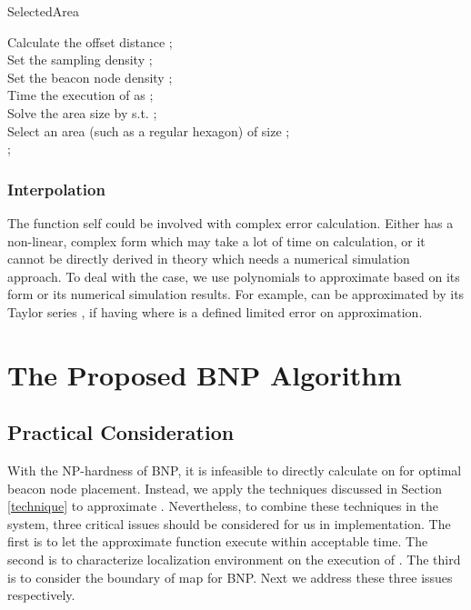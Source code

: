 \documentclass[10pt, conference, letterpaper]{IEEEtran}
\begin{document}
\begin{algorithm} \label{selectedArea}
\caption{SelectedArea}
Calculate the offset distance ;\\
Set the sampling density  ;\\
Set the beacon node density  ;\\
Time the execution of  as ;\\
Solve the area size  by  s.t. ;\\
Select an area  (such as a regular hexagon) of size ;\\
\Return ;
\end{algorithm}

\subsubsection{Interpolation} \label{interpolation}
The function  self could be involved with complex error calculation. Either  has a non-linear, complex form which may take a lot of time on calculation, or it cannot be directly derived in theory which needs a numerical simulation approach. To deal with the case, we use polynomials to approximate  based on its form or its numerical simulation results. For example,  can be approximated by its Taylor series , if  having  where  is a defined limited error on approximation.

\vspace{0.3ex}

\section{The Proposed BNP Algorithm} \label{synthesize}
\subsection{Practical Consideration} \label{sys_consideration}
With the NP-hardness of BNP, it is infeasible to directly calculate on  for optimal beacon node placement. Instead, we apply the techniques discussed in Section \ref{technique} to approximate . Nevertheless, to combine these techniques in the system, three critical issues should be considered for us in implementation. The first is to let the approximate function  execute within acceptable time. The second is to characterize localization environment on the execution of . The third is to consider the boundary of map for BNP. Next we address these three issues respectively.
\end{document}
